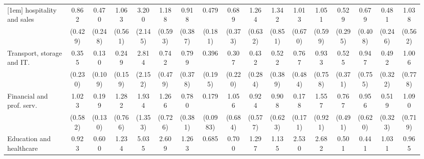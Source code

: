 {\begin{tabular}{l*{16}{c}}
[1em]
hospitality and sales&       0.862         &       0.470         &       1.063         &       3.200         &       1.188         &       0.918         &       0.479         &       0.689         &       1.264         &       1.342         &       1.013         &       1.051         &       0.529         &       0.679         &       0.481         &       1.038         \\
                    &     (0.429)         &     (0.248)         &     (0.561)         &     (2.145)         &     (0.593)         &     (0.387)         &     (0.181)         &     (0.373)         &     (0.632)         &     (0.851)         &     (0.670)         &     (0.599)         &     (0.295)         &     (0.408)         &     (0.246)         &     (0.562)         \\
[1em]
Transport, storage and IT.&       0.355         &       0.130\sym{*}  &       0.249\sym{*}  &       2.814         &       0.742         &       0.799         &       0.396         &       0.307         &       0.432         &       0.522         &       0.767         &       0.933         &       0.525         &       0.947         &       0.492         &       1.006         \\
                    &     (0.230)         &     (0.109)         &     (0.159)         &     (2.152)         &     (0.479)         &     (0.378)         &     (0.195)         &     (0.220)         &     (0.284)         &     (0.389)         &     (0.484)         &     (0.758)         &     (0.371)         &     (0.755)         &     (0.322)         &     (0.778)         \\
[1em]
Financial and prof. serv.&       1.023         &       0.199\sym{*}  &       1.282         &       1.934         &       1.266         &       0.780         &       0.179\sym{**} &       1.056         &       0.924         &       0.908         &       0.178         &       1.557         &       0.767         &       0.956         &       0.519         &       1.090         \\
                    &     (0.582)         &     (0.130)         &     (0.766)         &     (1.353)         &     (0.726)         &     (0.381)         &    (0.0983)         &     (0.684)         &     (0.577)         &     (0.623)         &     (0.171)         &     (0.921)         &     (0.491)         &     (0.620)         &     (0.323)         &     (0.719)         \\
[1em]
Education and healthcare&       0.923         &       0.600         &       1.234         &       5.035\sym{*}  &       2.609         &       1.263         &       0.685         &       0.700         &       1.297         &       1.135         &       2.530         &       2.682         &       0.501         &       0.441         &       1.031         &       0.965         \\

\end{tabular}}
